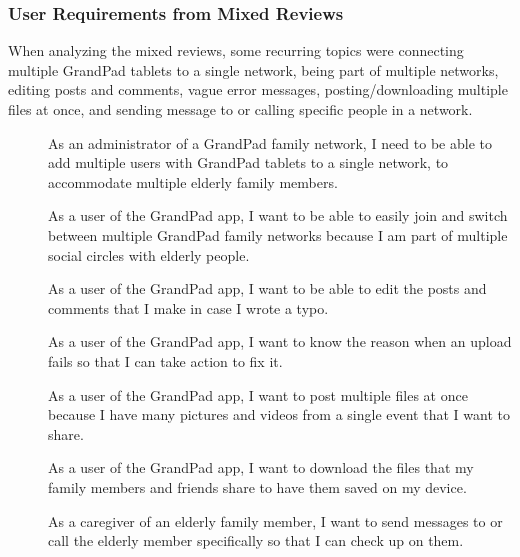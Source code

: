 \subsubsection*{User Requirements from Mixed Reviews}

When analyzing the mixed reviews, some recurring topics were
    connecting multiple GrandPad tablets to a single network,
    being part of multiple networks,
    editing posts and comments,
    vague error messages,
    posting/downloading multiple files at once,
    and sending message to or calling specific people in a network.

\begin{description}
    \item[\textbf{\showusernetcounter}]
        As an administrator of a GrandPad family network, I need to be able to
            add multiple users with GrandPad tablets to a single network, to
            accommodate multiple elderly family members.
    \item[\textbf{\showusernetcounter}]
        As a user of the GrandPad app, I want to be able to easily join and
            switch between multiple GrandPad family networks because I am part
            of multiple social circles with elderly people.
    \item[\textbf{\showuserpostcounter}]
        As a user of the GrandPad app, I want to be able to edit the posts and
            comments that I make in case I wrote a typo.
    \item[\textbf{\showuseruicounter}]
        As a user of the GrandPad app, I want to know the reason when an upload
            fails so that I can take action to fix it.
    \item[\textbf{\showuserpostcounter}]
        As a user of the GrandPad app, I want to post multiple files at once
            because I have many pictures and videos from a single event that I
            want to share.
    \item[\textbf{\showuserpostcounter}]
        As a user of the GrandPad app, I want to download the files that my
            family members and friends share to have them saved on my device.
    \item[\textbf{\showusercallcounter}]
        As a caregiver of an elderly family member, I want to send messages to
            or call the elderly member specifically so that I can check up on
            them.
\end{description}

